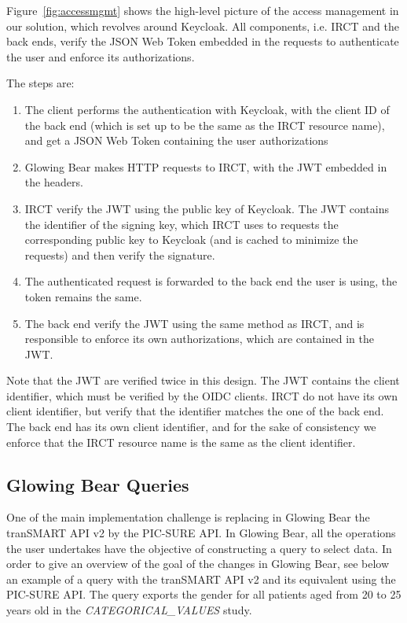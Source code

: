 Figure~\ref{fig:accessmgmt} shows the high-level picture of the access management in our solution, which revolves around Keycloak.
All components, i.e. IRCT and the back ends, verify the JSON Web Token embedded in the requests to authenticate the user and enforce its authorizations. %

The steps are:
\begin{enumerate}
    \item The client performs the authentication with Keycloak, with the client ID of the back end (which is set up to be the same as the IRCT resource name), and get a JSON Web Token containing the user authorizations
    \item Glowing Bear makes HTTP requests to IRCT, with the JWT embedded in the headers.
    \item IRCT verify the JWT using the public key of Keycloak. 
    The JWT contains the identifier of the signing key, which IRCT uses to requests the corresponding public key to Keycloak (and is cached to minimize the requests) and then verify the signature.
    \item The authenticated request is forwarded to the back end the user is using, the token remains the same.
    \item The back end verify the JWT using the same method as IRCT, and is responsible to enforce its own authorizations, which are contained in the JWT.
\end{enumerate}

Note that the JWT are verified twice in this design. 
The JWT contains the client identifier, which must be verified by the OIDC clients.
IRCT do not have its own client identifier, but verify that the identifier matches the one of the back end.
The back end has its own client identifier, and for the sake of consistency we enforce that the IRCT resource name is the same as the client identifier.


\subsection{Glowing Bear Queries}

One of the main implementation challenge is replacing in Glowing Bear the tranSMART API v2 by the PIC-SURE API.
In Glowing Bear, all the operations the user undertakes have the objective of constructing a query to select data.
In order to give an overview of the goal of the changes in Glowing Bear, see below an example of a query with the tranSMART API v2 and its equivalent using the PIC-SURE API.
The query exports the gender for all patients aged from 20 to 25 years old in the \emph{CATEGORICAL\_VALUES} study.

